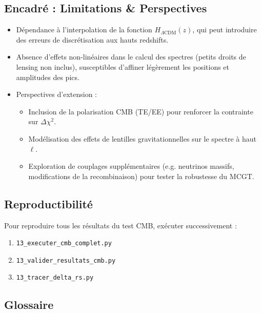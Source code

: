 \subsection*{Encadré : Limitations \& Perspectives}

\begin{itemize}
  \item Dépendance à l’interpolation de la fonction \(H_{\Lambda\mathrm{CDM}}(z)\),  
        qui peut introduire des erreurs de discrétisation aux hauts redshifts.  
  \item Absence d’effets non-linéaires dans le calcul des spectres (petits droits de lensing non inclus),  
        susceptibles d’affiner légèrement les positions et amplitudes des pics.  
  \item Perspectives d’extension :
    \begin{itemize}
      \item Inclusion de la polarisation CMB (TE/EE) pour renforcer la contrainte sur \(\Delta\chi^2\).  
      \item Modélisation des effets de lentilles gravitationnelles sur le spectre à haut \(\ell\).  
      \item Exploration de couplages supplémentaires (e.g. neutrinos massifs, modifications de la recombinaison) pour tester la robustesse du MCGT.
    \end{itemize}
\end{itemize}

\subsection{Reproductibilité}

Pour reproduire tous les résultats du test CMB, exécuter successivement :
\begin{enumerate}
  \item \texttt{13\_executer\_cmb\_complet.py}
  \item \texttt{13\_valider\_resultats\_cmb.py}
  \item \texttt{13\_tracer\_delta\_rs.py}
\end{enumerate}

\subsection*{Glossaire}

